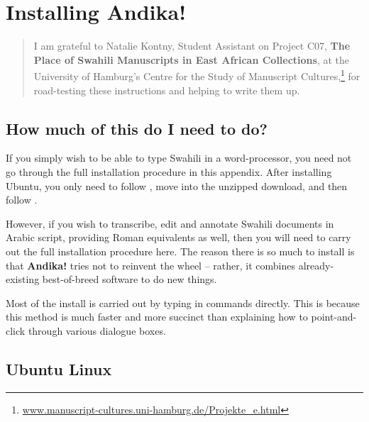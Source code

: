 \chapter{Installing \textbf{Andika!}}
\renewcommand{\thesection}{A/\arabic{section}}  %
\setcounter{section}{0}  %
\label{appA}


\begin{quotation}
\begin{small}
\noindent I am grateful to Natalie Kontny, Student Assistant on Project C07, \textbf{The Place of Swahili Manuscripts in East African Collections},  at the University of Hamburg's Centre for the Study of Manuscript Cultures,\footnote{\url{www.manuscript-cultures.uni-hamburg.de/Projekte_e.html}} for road-testing these instructions and helping to write them up.                                                                                                                                                                                                                                                                                                                                                                         \end{small}
\end{quotation}


\section{How much of this do I need to do?}

If you simply wish to be able to type Swahili in a word-processor, you need not go through the full installation procedure in this appendix.  After installing Ubuntu, you only need to follow , move into the unzipped download, and then follow .

However, if you wish to transcribe, edit and annotate Swahili documents in Arabic script, providing Roman equivalents as well, then you will need to carry out the full installation procedure here.  The reason there is so much to install is that \textbf{Andika!} tries not to reinvent the wheel -- rather, it combines already-existing best-of-breed software to do new things.

Most of the install is carried out by typing in commands directly.  This is because this method is much faster and more succinct than explaining how to point-and-click through various dialogue boxes.


\section{Ubuntu Linux}

